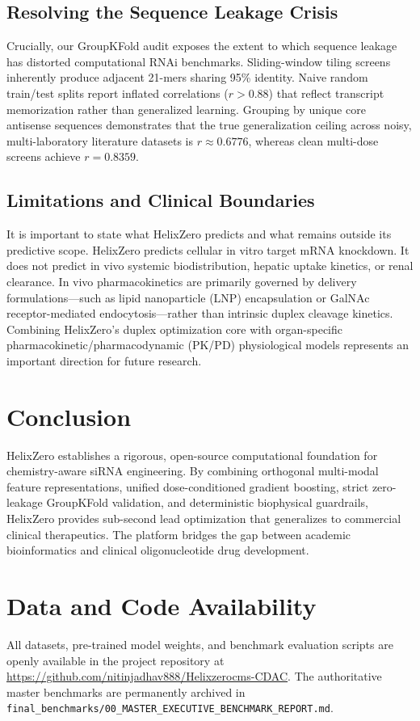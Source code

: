 \documentclass[twocolumn]{article}
\begin{document}
\subsection{Resolving the Sequence Leakage Crisis}
Crucially, our GroupKFold audit exposes the extent to which sequence leakage has distorted computational RNAi benchmarks. Sliding-window tiling screens inherently produce adjacent 21-mers sharing 95\% identity. Naive random train/test splits report inflated correlations ($r > 0.88$) that reflect transcript memorization rather than generalized learning. Grouping by unique core antisense sequences demonstrates that the true generalization ceiling across noisy, multi-laboratory literature datasets is $r \approx 0.6776$, whereas clean multi-dose screens achieve $r = 0.8359$.

\subsection{Limitations and Clinical Boundaries}
It is important to state what HelixZero predicts and what remains outside its predictive scope. HelixZero predicts cellular in vitro target mRNA knockdown. It does not predict in vivo systemic biodistribution, hepatic uptake kinetics, or renal clearance. In vivo pharmacokinetics are primarily governed by delivery formulations---such as lipid nanoparticle (LNP) encapsulation or GalNAc receptor-mediated endocytosis---rather than intrinsic duplex cleavage kinetics. Combining HelixZero's duplex optimization core with organ-specific pharmacokinetic/pharmacodynamic (PK/PD) physiological models represents an important direction for future research.

\section{Conclusion}
HelixZero establishes a rigorous, open-source computational foundation for chemistry-aware siRNA engineering. By combining orthogonal multi-modal feature representations, unified dose-conditioned gradient boosting, strict zero-leakage GroupKFold validation, and deterministic biophysical guardrails, HelixZero provides sub-second lead optimization that generalizes to commercial clinical therapeutics. The platform bridges the gap between academic bioinformatics and clinical oligonucleotide drug development.

\section*{Data and Code Availability}
All datasets, pre-trained model weights, and benchmark evaluation scripts are openly available in the project repository at \url{https://github.com/nitinjadhav888/Helixzerocms-CDAC}. The authoritative master benchmarks are permanently archived in \texttt{final\_benchmarks/00\_MASTER\_EXECUTIVE\_BENCHMARK\_REPORT.md}.
\end{document}
